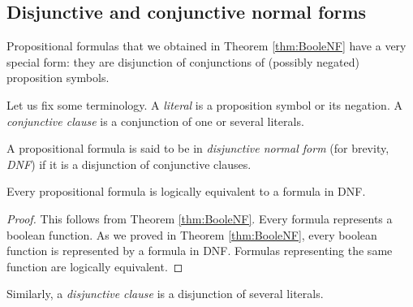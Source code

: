 \begin{page}
\setcounter{section}{1}
\setcounter{subsection}{5}
\setcounter{dfn}{15}
\label{portion:457}

\subsection{Disjunctive and conjunctive normal forms}
Propositional formulas that we obtained in Theorem \ref{thm:BooleNF} have a very special form:
they are disjunction of conjunctions of (possibly negated) proposition symbols.

Let us fix some terminology.
A \emph{literal} is a proposition symbol or its negation.
A \emph{conjunctive clause} is a conjunction of one or several literals.


\end{page}

\begin{page}
\setcounter{section}{1}
\setcounter{subsection}{5}
\setcounter{dfn}{16}
\label{portion:459}

\begin{dfn}
A propositional formula is said to be in \emph{disjunctive normal form} (for brevity, \emph{DNF})
if it is a disjunction of conjunctive clauses.
\end{dfn}

\end{page}

\begin{page}
\setcounter{section}{1}
\setcounter{subsection}{5}
\setcounter{dfn}{17}
\label{portion:462}

\begin{cor}
\label{cor:DNF}
Every propositional formula is logically equivalent to a formula in DNF.
\end{cor}

\end{page}

\begin{page}
\setcounter{section}{1}
\setcounter{subsection}{5}
\setcounter{dfn}{17}
\label{portion:463}

\begin{proof}
This follows from Theorem \ref{thm:BooleNF}.
Every formula represents a boolean function.
As we proved in Theorem \ref{thm:BooleNF}, every boolean function is represented by a formula in DNF.
Formulas representing the same function are logically equivalent.
\end{proof}

Similarly, a \emph{disjunctive clause} is a disjunction of several literals.

\end{page}

